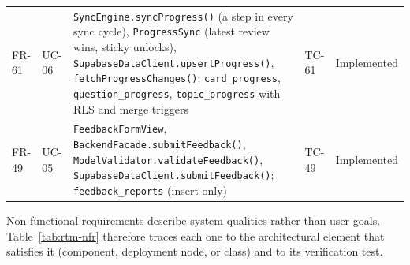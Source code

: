 \documentclass[12pt,letterpaper]{article}
\begin{document}
\begin{xltabular}{\textwidth}{@{}l L{1.6cm} Y L{2.0cm} L{1.9cm}@{}}
FR-61 & UC-06 & \texttt{SyncEngine.syncProgress()} (a step in every sync cycle), \texttt{ProgressSync} (latest review wins, sticky unlocks), \texttt{SupabaseDataClient.upsertProgress()}, \texttt{fetchProgressChanges()}; \texttt{card\_progress}, \texttt{question\_progress}, \texttt{topic\_progress} with RLS and merge triggers & TC-61 & Implemented \\
FR-49 & UC-05 & \texttt{FeedbackFormView}, \texttt{BackendFacade.submitFeedback()}, \texttt{ModelValidator.validateFeedback()}, \texttt{SupabaseDataClient.submitFeedback()}; \texttt{feedback\_reports} (insert-only) & TC-49 & Implemented \\
\end{xltabular}

Non-functional requirements describe system qualities rather than user goals.
Table~\ref{tab:rtm-nfr} therefore traces each one to the architectural element that
satisfies it (component, deployment node, or class) and to its verification test.
\end{document}
